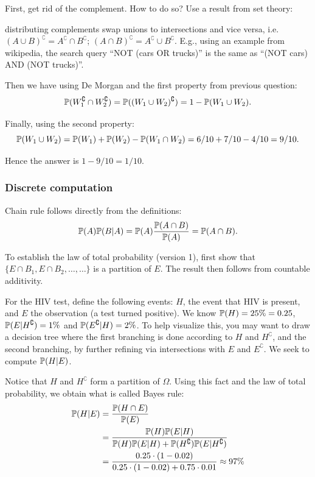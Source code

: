 \documentclass{article}
\begin{document}
First, get rid of the complement. How to do so? Use a result from set theory:

 distributing complements swap unions to intersections and vice versa, i.e. $(A \cup B)^\complement = A^\complement \cap B^\complement$;  $(A \cap B)^\complement = A^\complement \cup B^\complement$. E.g., using an example from wikipedia, the search query ``NOT (cars OR trucks)'' is the same as ``(NOT cars) AND (NOT trucks)''.

Then we have using De Morgan and the first property from previous question:
\[ \P(W_1^\complement \cap W_2^\complement) = \P((W_1 \cup W_2)^\complement) = 1 - \P(W_1 \cup W_2). \]

Finally, using the second property:
\[ \P(W_1 \cup W_2) = \P(W_1) + \P(W_2) - \P(W_1 \cap W_2) = 6/10 + 7/10 - 4/10 = 9/10. \]

Hence the answer is $1 - 9/10 = 1/10.$


\subsubsection{Discrete computation}

 Chain rule follows directly from the definitions:
\[ \P(A) \P(B | A) = \P(A) \frac{\P(A \cap B)}{\P(A)} = \P(A \cap B). \]

To establish the law of total probability (version 1), first show that $\{E \cap B_1, E \cap B_2, \dots, \dots\}$ is a partition of $E$. The result then follows from countable additivity.

 For the HIV test, define the following events: $H$, the event that HIV is present, and $E$ the observation (a test turned positive). We know $\P(H) = 25\% = 0.25$, $\P(E | H^\complement) = 1\%$ and $\P(E^\complement | H) = 2\%$. To help visualize this, you may want to draw a decision tree where the first branching is done according to $H$ and $H^\complement$, and the second branching, by further refining via intersections with  $E$ and $E^\complement$. We seek to compute $\P(H|E)$.

Notice that $H$ and $H^\complement$ form a partition of $\Omega$. Using this fact and the law of total probability, we obtain what is called Bayes rule:
\begin{align*}
	\P(H|E) &= \frac{\P(H \cap E)}{\P(E)} \\
	&= \frac{\P(H) \P(E | H)}{\P(H) \P(E | H) + \P(H^\complement) \P(E | H^\complement)} \\
	&= \frac{0.25 \cdot (1-0.02)}{0.25 \cdot (1-0.02) + 0.75 \cdot 0.01} \approx 97\%
\end{align*}
\end{document}
